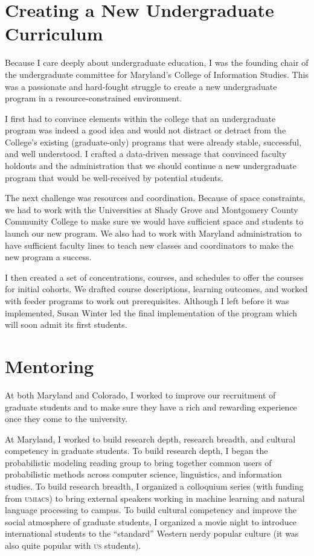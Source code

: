 \documentclass[11pt]{amsart}
\newcommand{\abr}[1]{\textsc{#1}}
\begin{document}
\section{Creating a New Undergraduate Curriculum}

Because I care deeply about undergraduate education, I was the founding chair of
the undergraduate committee for Maryland's College of Information Studies.  This was a
passionate and hard-fought struggle to create a new undergraduate program in a
resource-constrained environment.

I first had to convince elements within the college that an undergraduate
program was indeed a good idea and would not distract or detract from the
College's existing (graduate-only) programs that were already stable,
successful, and well understood.  I crafted a data-driven message that convinced
faculty holdouts and the administration that we should continue a new
undergraduate program that would be well-received by potential students.

The next challenge was resources and coordination.  Because of space constraints,
we had to work with the Universities at Shady Grove and Montgomery County
Community College to make sure we would have sufficient space and students to
launch our new program.  We also had to work with Maryland administration to
have sufficient faculty lines to teach new classes and coordinators to make the
new program a success.

I then created a set of concentrations, courses, and schedules to offer the
courses for initial cohorts.  We drafted course descriptions, learning outcomes,
and worked with feeder programs to work out prerequisites.  Although I left
before it was implemented, Susan Winter led the final implementation of the
program which will soon admit its first students.

\section{Mentoring}



At both Maryland and Colorado, I worked to improve our recruitment of graduate
students and to make sure they have a rich and rewarding experience once they
come to the university.

At Maryland, I worked to build research depth, research breadth, and cultural
competency in graduate students.  To build research depth, I began the
probabilistic modeling reading group to bring together common users of
probabilistic methods across computer science, linguistics, and information
studies.  To build research breadth, I organized a colloquium series (with
funding from \abr{umiacs}) to bring external speakers working in machine
learning and natural language processing to campus.  To build cultural
competency and improve the social atmosphere of graduate students, I organized a
movie night to introduce international students to the ``standard'' Western
nerdy popular culture (it was also quite popular with \abr{us} students).
\end{document}
